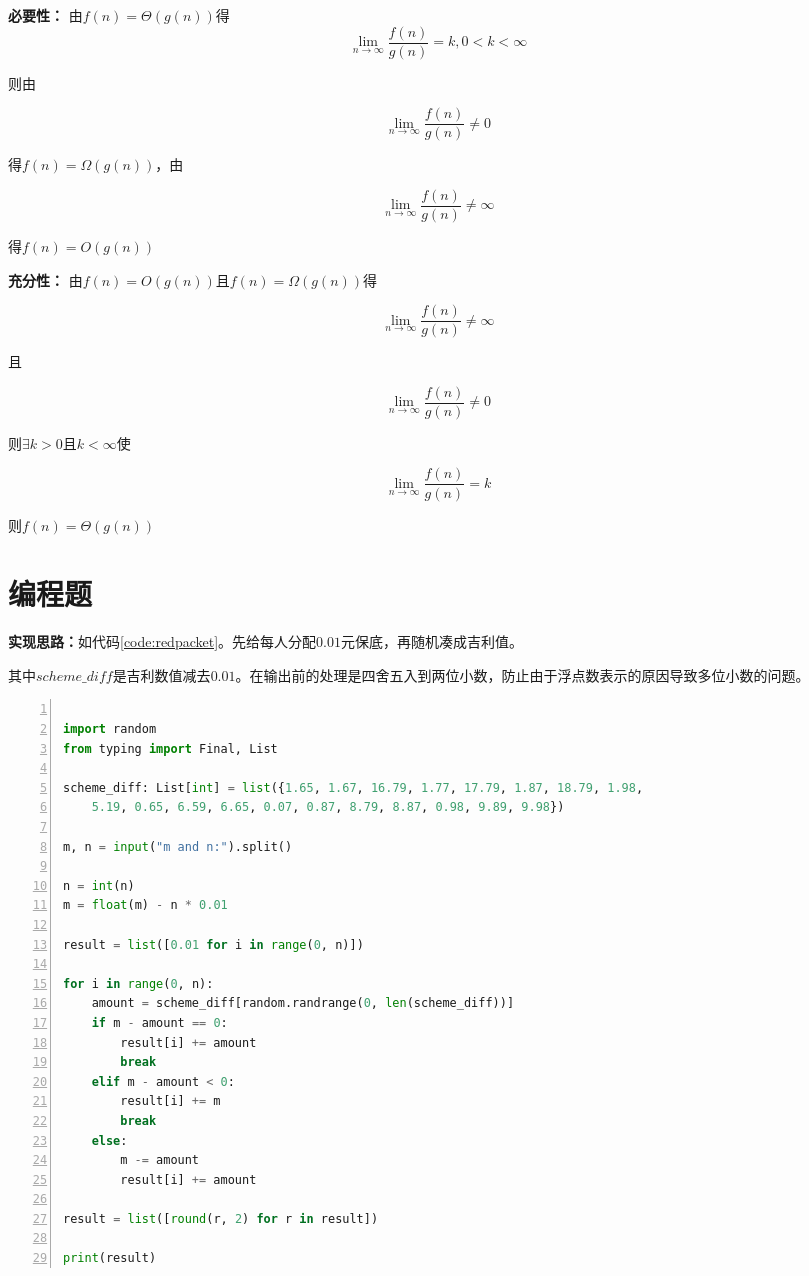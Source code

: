 \documentclass[a4paper,twoside]{article}
\begin{document}
\begin{spacing}{1.2}
\textbf{必要性：} 
由$f(n)=\Theta(g(n))$得
$$
\lim_{n \to \infty}\frac{f(n)}{g(n)}=k, 0<k<\infty
$$

则由

$$
\lim_{n \to \infty}\frac{f(n)}{g(n)} \ne 0
$$

得$f(n)=\Omega(g(n))$，由

$$
\lim_{n \to \infty}\frac{f(n)}{g(n)} \ne \infty
$$

得$f(n)=O(g(n))$

\textbf{充分性：}
由$f(n)=O(g(n))$且$f(n)=\Omega(g(n))$得

$$
\lim_{n \to \infty}\frac{f(n)}{g(n)} \ne \infty
$$

且

$$
\lim_{n \to \infty}\frac{f(n)}{g(n)} \ne 0
$$

则$\exists k>0$且$k<\infty$使

$$
\lim_{n \to \infty}\frac{f(n)}{g(n)} = k
$$

则$f(n)=\Theta(g(n))$

\section{编程题}

\textbf{实现思路：}如代码\ref{code:redpacket}。先给每人分配$0.01$元保底，再随机凑成吉利值。

其中$scheme\_diff$是吉利数值减去$0.01$。在输出前的处理是四舍五入到两位小数，防止由于浮点数表示的原因导致多位小数的问题。

\begin{lstlisting}[language=Python,numbers=left,style=PythonStyle,caption=红包发放,label={code:redpacket}]
	
import random
from typing import Final, List

scheme_diff: List[int] = list({1.65, 1.67, 16.79, 1.77, 17.79, 1.87, 18.79, 1.98,
	5.19, 0.65, 6.59, 6.65, 0.07, 0.87, 8.79, 8.87, 0.98, 9.89, 9.98})

m, n = input("m and n:").split()

n = int(n)
m = float(m) - n * 0.01

result = list([0.01 for i in range(0, n)])

for i in range(0, n):
	amount = scheme_diff[random.randrange(0, len(scheme_diff))]
	if m - amount == 0:
		result[i] += amount
		break
	elif m - amount < 0:
		result[i] += m
		break
	else:
		m -= amount
		result[i] += amount

result = list([round(r, 2) for r in result])

print(result)

\end{lstlisting}

\end{spacing}
\end{document}
